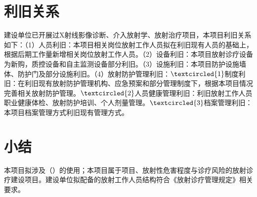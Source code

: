 \section{利旧关系}

建设单位已开展过X射线影像诊断、介入放射学、放射治疗项目，本项目利旧关系如下：（1）人员利旧：本项目相关岗位放射工作人员拟在利旧现有人员的基础上，根据后期工作量新增相关岗位放射工作人员。（2）设备利旧：本项目放射诊疗设备为新购，质控设备和自主监测设备部分利旧。（3）设施利旧：本项目防护设施墙体、防护门及部分设施利旧。（4）放射防护管理利旧：$\textcircled{1}$制度利旧：在利旧现有放射防护管理机构、应急预案和部分管理制度下，根据本项目情况完善相关放射防护管理。$\textcircled{2}$人员健康管理利旧：利旧放射工作人员职业健康体检、放射防护培训、个人剂量管理。$\textcircled{3}$档案管理利旧：本项目档案管理方式利旧现有管理方式。

\section{小结}

本项目拟涉及\sourcetype（\sourcesummary）的使用；本项目属于\projectnature 项目、放射性危害程度与诊疗风险\textbf{\radiationhazarddegree}的放射诊疗建设项目。建设单位拟配备的放射工作人员结构符合《放射诊疗管理规定》相关要求。
